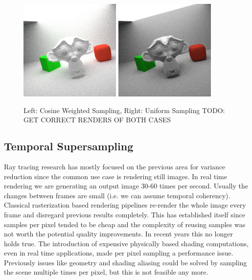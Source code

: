 \documentclass{ACGSeminar}
\begin{document}
\begin{figure}[htb!]

  \centering
  \includegraphics[width=5cm,natwidth=512,natheight=512]{figures/50_spp_cosine_weighted.png}
  \includegraphics[width=5cm,natwidth=512,natheight=512]{figures/50_spp_uniform.png}
  \caption{Left: Cosine Weighted Sampling, Right: Uniform Sampling TODO: GET CORRECT RENDERS OF BOTH CASES}
  \label{fig:rendering-cos-weighted}
\end{figure}

\subsection{Temporal Supersampling}
Ray tracing research has mostly focused on the previous area for variance reduction since the common use case is rendering still images.
In real time rendering we are generating an output image 30-60 times per second. Usually the changes between frames are small (i.e. we can assume temporal coherency). Classical rasterization based rendering pipelines re-render the whole image every frame and disregard previous results completely. This has established itself since samples per pixel tended to be cheap and the complexity of reusing samples was not worth the potential quality improvements.
In recent years this no longer holds true. The introduction of expensive physically based shading computations, even in real time applications, made per pixel sampling a performance issue. Previously issues like geometry and shading aliasing could be solved by sampling the scene multiple times per pixel, but this is not feasible any more.
\end{document}
